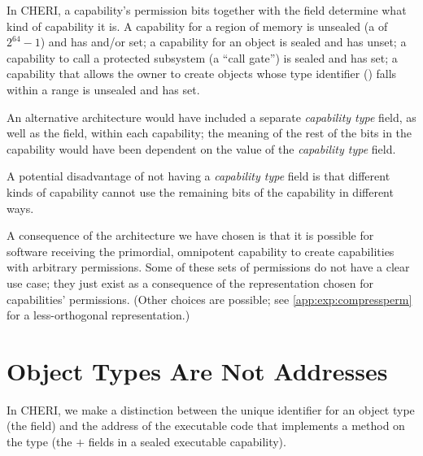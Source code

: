 In CHERI, a capability's permission bits together with the \cotype{} field
determine what kind of capability it is. A capability for a region of memory
is unsealed (a \cotype{} of $2^{64}-1$) and has \emph{\cappermL{}} and/or \emph{\cappermS{}} set;
a capability for an object is sealed and has \emph{\cappermX{}}
unset; a capability to call a protected subsystem (a ``call gate'') is
sealed and has \emph{\cappermX{}} set; a capability that allows
the owner to create objects whose type identifier (\cotype{}) falls within
a range is unsealed and has \emph{\cappermSeal{}} set.

An alternative architecture would have included a separate
\emph{capability type} field, as well as the \cperms{} field, within each
capability; the meaning of the rest of the bits in the capability would have
been dependent on the value of the \emph{capability type} field.

A potential disadvantage of not having a \emph{capability type} field is that
different kinds of capability cannot use the remaining bits of the capability
in different ways.

A consequence of the architecture we have chosen is that it is possible for
software receiving the primordial, omnipotent capability to create capabilities
with arbitrary permissions.  Some of these sets of permissions do not have a
clear use case; they just exist as a consequence of the representation chosen
for capabilities' permissions.  (Other choices are possible; see
\cref{app:exp:compressperm} for a less-orthogonal representation.)


\section{Object Types Are Not Addresses}

In CHERI, we make a distinction between the unique identifier for an
object type (the \cotype{} field) and the address of the executable code
that implements a method on the type (the \cbase{} $+$ \coffset{} fields
in a sealed executable capability).

